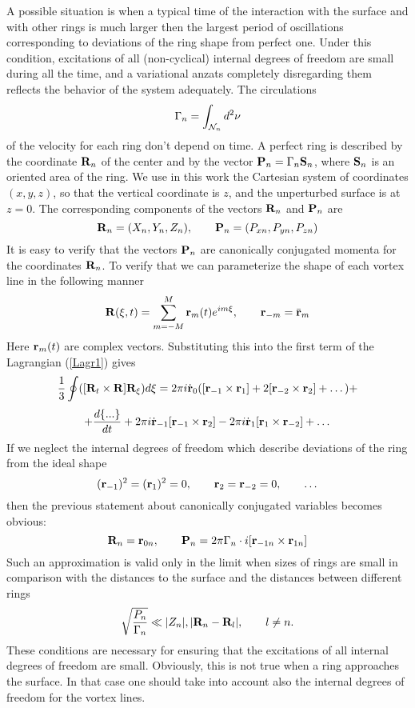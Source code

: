 A possible situation is  
when a typical time of the interaction with the surface and with other rings is
much larger then the largest period of oscillations corresponding to deviations 
of the ring shape from perfect one. Under this condition, excitations of all 
(non-cyclical) internal degrees of freedom are small during all the time, 
and a variational anzats completely disregarding them 
reflects the behavior of the system adequately. The circulations  
$$
\Gamma_n=\int_{{\cal N}_n}d^2\nu
$$ 
of the velocity for each ring don't depend on time. 
A perfect ring is described by the coordinate ${\bf R}_n$
of the center and by the vector ${\bf P}_n=\Gamma_n{\bf S}_n$, where
${\bf S}_n$ is an oriented area of the ring. We use in this work 
the Cartesian system of coordinates $(x,y,z)$, so that 
the vertical coordinate is $z$, and the unperturbed surface is at $z=0$.
The corresponding components of the vectors ${\bf R}_n$ and ${\bf P}_n$ are
$$
{\bf R}_n=(X_n,Y_n,Z_n),\qquad {\bf P}_n=(P_{xn},P_{yn},P_{zn})
$$
It is easy to verify that the 
vectors ${\bf P}_n$ are canonically conjugated momenta for the coordinates 
${\bf R}_n$. To verify that we can parameterize the shape of each
vortex line in the following manner
\begin{equation}
{\bf R}(\xi,t)=\sum_{m=-M}^{M}{\bf r}_m(t)e^{im\xi},
\qquad {\bf r}_{-m}=\bar{\bf r}_m
\end{equation}
Here ${\bf r}_m(t)$ are complex vectors. Substituting this into the first term
of the Lagrangian (\ref{Lagr1}) gives
$$
\frac{1}{3}\oint([{\bf R}_t\times{\bf R}]{\bf R}_{\xi})d\xi=
2\pi i\dot{\bf r}_0([{\bf r}_{-1}\times{\bf r}_1]+
2[{\bf r}_{-2}\times{\bf r}_2]+\dots)+
$$
\begin{equation}
+\frac{d \{...\}}{dt}+2\pi i\dot{\bf r}_{-1}[{\bf r}_{-1}\times{\bf r}_2]
-2\pi i\dot{\bf r}_1[{\bf r}_1\times{\bf r}_{-2}] +\dots
\end{equation}
If we neglect the internal degrees of freedom which describe deviations of 
the ring  from the ideal shape
$$
({\bf r}_{-1})^2=({\bf r}_1)^2=0 ,\qquad
{\bf r}_2={\bf r}_{-2}=0,\qquad\dots
$$
then the previous statement about canonically conjugated variables 
becomes obvious:
\begin{equation}
{\bf R}_n={\bf r}_{0n},\qquad
{\bf P}_n=2\pi \Gamma_n \cdot i[{\bf r}_{-1n}\times{\bf r}_{1n}]
\end{equation}
Such an approximation is valid only in the 
limit when  sizes of rings are small in comparison with the distances to 
the surface and the distances between different rings
\begin{equation}\label{dipoles}
\sqrt{\frac{P_n}{\Gamma_n}}\ll |Z_n|,|{\bf R}_{n}-{\bf R}_{l}|,
\qquad l\not=n. 
\end{equation}
These conditions are necessary for ensuring that the excitations of all internal degrees 
of freedom are small. Obviously, this is not true when a ring approaches 
the surface. In that case one should take into account also the internal 
degrees of freedom for the vortex lines. 

